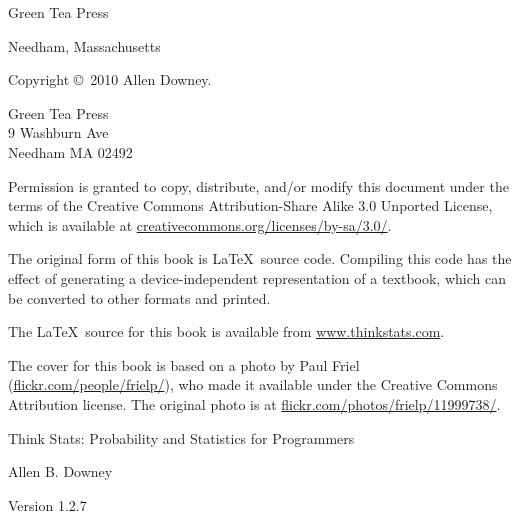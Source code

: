 \documentclass[12pt]{book}
\newcommand{\thetitle}{Think Stats: Probability and Statistics for Programmers}
\newcommand{\theversion}{1.2.7}
\begin{document}
\begin{latexonly}
\begin{flushright}
\vspace{0.5in}

{\Large Green Tea Press}

{\small Needham, Massachusetts}

\vfill

\end{flushright}


\pagebreak
\thispagestyle{empty}

{\small
Copyright \copyright ~2010 Allen Downey.


\vspace{0.2in}

\begin{flushleft}
Green Tea Press       \\
9 Washburn Ave \\
Needham MA 02492
\end{flushleft}

Permission is granted to copy, distribute, and/or modify this document
under the terms of the Creative Commons Attribution-Share Alike 3.0 Unported
License, which is available at \url{creativecommons.org/licenses/by-sa/3.0/}.

The original form of this book is \LaTeX\ source code.  Compiling this
code has the effect of generating a device-independent representation
of a textbook, which can be converted to other formats and printed.

The \LaTeX\ source for this book is available from
\url{www.thinkstats.com}.

The cover for this book is based on a photo by Paul Friel
(\url{flickr.com/people/frielp/}), who made it available under
the Creative Commons Attribution license.  The original photo
is at \url{flickr.com/photos/frielp/11999738/}.

\vspace{0.2in}

} %

\end{latexonly}



\begin{htmlonly}


{\Large \thetitle}

{\large Allen B. Downey}

Version \theversion

\setcounter{chapter}{-1}

\end{htmlonly}
\end{document}
